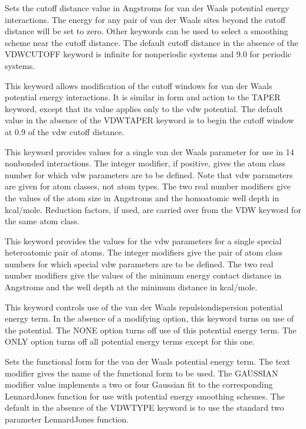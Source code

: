 \documentclass[letterpaper,11pt,english]{sphinxmanual}
\begin{document}
  Sets the cutoff distance value in Angstroms for van der Waals potential energy interactions. The energy for any pair of van der Waals sites beyond the cutoff distance will be set to zero. Other keywords can be used to select a smoothing scheme near the cutoff distance. The default cutoff distance in the absence of the VDW\sphinxhyphen{}CUTOFF keyword is infinite for nonperiodic systems and 9.0 for periodic systems.

  This keyword allows modification of the cutoff windows for van der Waals potential energy interactions. It is similar in form and action to the TAPER keyword, except that its value applies only to the vdw potential. The default value in the absence of the VDW\sphinxhyphen{}TAPER keyword is to begin the cutoff window at 0.9 of the vdw cutoff distance.

  This keyword provides values for a single van der Waals parameter for use in 1\sphinxhyphen{}4 nonbonded interactions. The integer modifier, if positive, gives the atom class number for which vdw parameters are to be defined. Note that vdw parameters are given for atom classes, not atom types. The two real number modifiers give the values of the atom size in Angstroms and the homoatomic well depth in kcal/mole. Reduction factors, if used, are carried over from the VDW keyword for the same atom class.

  This keyword provides the values for the vdw parameters for a single special heteroatomic pair of atoms. The integer modifiers give the pair of atom class numbers for which special vdw parameters are to be defined. The two real number modifiers give the values of the minimum energy contact distance in Angstroms and the well depth at the minimum distance in kcal/mole.

  This keyword controls use of the van der Waals repulsion\sphinxhyphen{}dispersion potential energy term. In the absence of a modifying option, this keyword turns on use of the potential. The NONE option turns off use of this potential energy term. The ONLY option turns off all potential energy terms except for this one.

  Sets the functional form for the van der Waals potential energy term. The text modifier gives the name of the functional form to be used. The GAUSSIAN modifier value implements a two or four Gaussian fit to the corresponding Lennard\sphinxhyphen{}Jones function for use with potential energy smoothing schemes. The default in the absence of the VDWTYPE keyword is to use the standard two parameter Lennard\sphinxhyphen{}Jones function.
\end{document}
